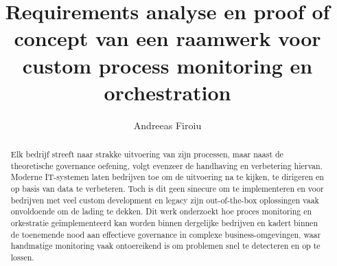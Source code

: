 \documentclass[a0,portrait]{hogent-poster}
\title{Requirements analyse en proof of concept van een raamwerk voor custom process monitoring en orchestration}
\author{Andreeas Firoiu}
\begin{document}
\maketitle

\begin{abstract}
Elk bedrijf streeft naar strakke uitvoering van zijn processen, maar naast de theoretische governance oefening, volgt evenzeer de handhaving en verbetering hiervan. Moderne IT-systemen laten bedrijven toe om de uitvoering na te kijken, te dirigeren en op basis van data te verbeteren. Toch is dit geen sinecure om te implementeren en voor bedrijven met veel custom development en legacy zijn out-of-the-box oplossingen vaak onvoldoende om de lading te dekken. 
Dit werk onderzoekt hoe proces monitoring en orkestratie geïmplementeerd kan worden binnen dergelijke bedrijven en kadert binnen de toenemende nood aan effectieve governance in complexe business-omgevingen, waar handmatige monitoring vaak ontoereikend is om problemen snel te detecteren en op te lossen.
\end{abstract}
\end{document}
